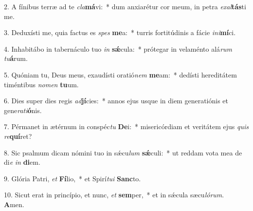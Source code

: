 2. A fínibus terræ ad te \textit{cla}\textbf{má}vi:~*  dum anxiarétur cor meum, in petra \textit{ex}\textit{al}\textbf{tás}ti me.\

3. Deduxísti me, quia factus es \textit{spes} \textbf{me}a:~*  turris fortitúdinis a fácie \textit{in}\textit{i}\textbf{mí}ci.\

4. Inhabitábo in tabernáculo tuo \textit{in} \textbf{sǽ}cula:~*  prótegar in velaménto alá\textit{rum} \textit{tu}\textbf{á}rum.\

5. Quóniam tu, Deus meus, exaudísti oratió\textit{nem} \textbf{me}am:~*  dedísti hereditátem timéntibus \textit{no}\textit{men} \textbf{tu}um.\

6. Dies super dies regis \textit{ad}\textbf{jí}cies:~*  annos ejus usque in diem generatiónis et gene\textit{ra}\textit{ti}\textbf{ó}nis.\

7. Pérmanet in ætérnum in conspéc\textit{tu} \textbf{De}i:~*  misericórdiam et veritátem ejus \textit{quis} \textit{re}\textbf{quí}ret?\

8. Sic psalmum dicam nómini tuo in sǽcu\textit{lum} \textbf{sǽ}culi:~*  ut reddam vota mea de di\textit{e} \textit{in} \textbf{di}em.\

9. Glória Patri, \textit{et} \textbf{Fí}lio,~*  et Spirí\textit{tu}\textit{i} \textbf{Sanc}to.\

10. Sicut erat in princípio, et nunc, \textit{et} \textbf{sem}per,~*  et in sǽcula sæcu\textit{ló}\textit{rum}. \textbf{A}men.\

